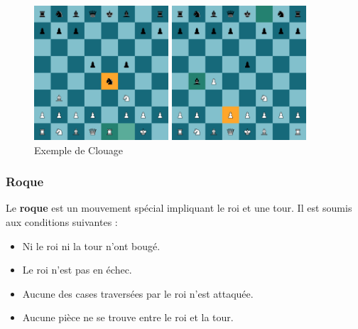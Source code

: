 \documentclass{article}
\begin{document}
\begin{figure}[h]
    \centering
    \begin{minipage}[b]{0.45\textwidth}
        \centering
        \includegraphics[width=\textwidth,height=5cm,keepaspectratio]{clouage1.png}
    \end{minipage}
    \hspace{0.005\textwidth}
    \begin{minipage}[b]{0.45\textwidth}
        \centering
        \includegraphics[width=\textwidth,height=5cm,keepaspectratio]{clouage2.png}
    \end{minipage}
    \caption{Exemple de Clouage}
\end{figure}

\subsubsection*{Roque}
Le \textbf{roque} est un mouvement spécial impliquant le roi et une tour. Il est soumis aux conditions suivantes :
\begin{itemize}
    \item Ni le roi ni la tour n'ont bougé.
    \item Le roi n'est pas en échec.
    \item Aucune des cases traversées par le roi n'est attaquée.
    \item Aucune pièce ne se trouve entre le roi et la tour.
\end{itemize}
\end{document}
